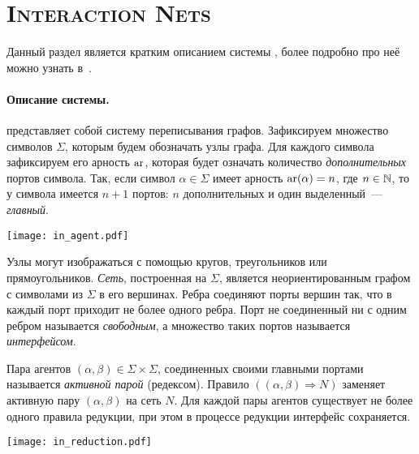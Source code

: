 
\section{\texorpdfstring{\textsc{Interaction Nets}}{Interaction Nets}}
\label{sec:ins}

Данный раздел является кратким описанием системы \INs{}, более подробно про неё можно узнать в~\cite{lafontInteractionCombinators1997a, satoDesignImplementationLowlevel2015, salikhmetovInteractionNetsRussian2013}.

\paragraph{Описание системы.}

\INs{} представляет собой систему переписывания графов.
Зафиксируем множество символов $\Sigma$, которым будем обозначать узлы графа.
Для каждого символа зафиксируем его арность $\operatorname{ar}$, которая будет означать количество \textit{дополнительных} портов символа.
Так, если символ $\alpha \in \Sigma$ имеет арность $\operatorname{ar}(\alpha) = n$, где $n \in \mathbb{N}$, то у символа имеется $n+1$ портов: $n$ дополнительных и один выделенный~--- \textit{главный}.

\begin{center}
      \texttt{[image: in\_agent.pdf]}
\end{center}

Узлы могут изображаться с помощью кругов, треугольников или прямоугольников.
\textit{Сеть}, построенная на $\Sigma$, является неориентированным графом с символами из $\Sigma$ в его вершинах.
Ребра соединяют порты вершин так, что в каждый порт приходит не более одного ребра.
Порт не соединенный ни с одним ребром называется \textit{свободным}, а множество таких портов называется \textit{интерфейсом}.

Пара агентов $(\alpha, \beta) \in \Sigma \times \Sigma$, соединенных своими главными портами называется \textit{активной парой} (редексом).
Правило $((\alpha, \beta) \Longrightarrow N)$ заменяет активную пару $(\alpha, \beta)$ на сеть $N$.
Для каждой пары агентов существует не более одного правила редукции, при этом в процессе редукции интерфейс сохраняется.

\begin{center}
      \texttt{[image: in\_reduction.pdf]}
\end{center}

